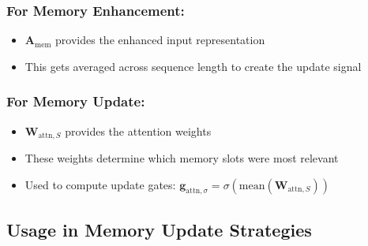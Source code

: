 \documentclass{article}
\begin{document}
\subsubsection{For Memory Enhancement:}
\begin{itemize}
\item $\mathbf{A}_{\text{mem}}$ provides the enhanced input representation
\item This gets averaged across sequence length to create the update signal
\end{itemize}

\subsubsection{For Memory Update:}
\begin{itemize}
\item $\mathbf{W}_{\text{attn},S}$ provides the attention weights
\item These weights determine which memory slots were most relevant
\item Used to compute update gates: $\mathbf{g}_{\text{attn},\sigma} = \sigma(\text{mean}(\mathbf{W}_{\text{attn},S}))$
\end{itemize}

\subsection{Usage in Memory Update Strategies}
\end{document}
